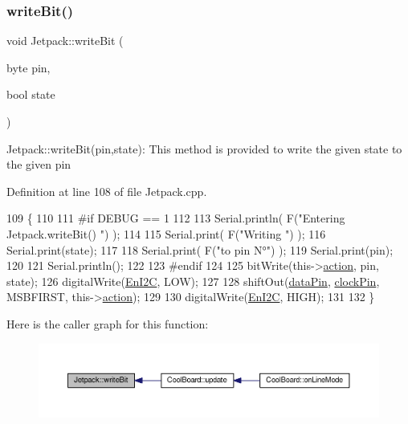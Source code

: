 \subsubsection{\texorpdfstring{write\+Bit()}{writeBit()}}
{\footnotesize\ttfamily void Jetpack\+::write\+Bit (\begin{DoxyParamCaption}\item[{byte}]{pin,  }\item[{bool}]{state }\end{DoxyParamCaption})}

Jetpack\+::write\+Bit(pin,state)\+: This method is provided to write the given state to the given pin 

Definition at line 108 of file Jetpack.\+cpp.


\begin{DoxyCode}
109 \{
110 
111 \textcolor{preprocessor}{#if DEBUG == 1 }
112 
113     Serial.println( F(\textcolor{stringliteral}{"Entering Jetpack.writeBit() "}) );
114 
115     Serial.print( F(\textcolor{stringliteral}{"Writing "}) );
116     Serial.print(state);
117 
118     Serial.print( F(\textcolor{stringliteral}{"to pin N°"}) );
119     Serial.print(pin);
120 
121     Serial.println();
122 
123 \textcolor{preprocessor}{#endif}
124 
125     bitWrite(this->\hyperlink{class_jetpack_aca3142925a7b0834b34ae91d26af7765}{action}, pin, state);
126     digitalWrite(\hyperlink{class_jetpack_a81df984fb4cea98c71aa1a1cfcdfe814}{EnI2C}, LOW);
127     
128     shiftOut(\hyperlink{class_jetpack_a3d669a56e93c71dd25f970d4ed7d0c00}{dataPin}, \hyperlink{class_jetpack_a58ebb991f358f3ae94e82148b0221b5a}{clockPin}, MSBFIRST, this->\hyperlink{class_jetpack_aca3142925a7b0834b34ae91d26af7765}{action});
129 
130     digitalWrite(\hyperlink{class_jetpack_a81df984fb4cea98c71aa1a1cfcdfe814}{EnI2C}, HIGH);
131 
132 \}
\end{DoxyCode}
Here is the caller graph for this function\+:\nopagebreak
\begin{figure}[H]
\begin{center}
\leavevmode
\includegraphics[width=350pt]{df/d1d/class_jetpack_a79ae7bc3c1828a0551a7c005c4f8bd00_icgraph}
\end{center}
\end{figure}


